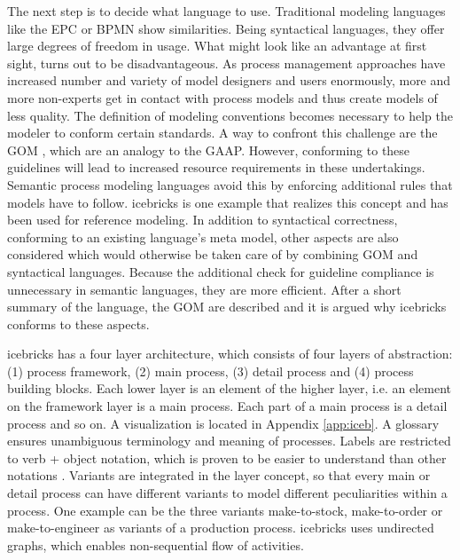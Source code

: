 	 The next step is to decide what language to use. Traditional modeling languages like the \acrfull{EPC} or \acrfull{BPMN} show similarities. Being syntactical languages, they offer large degrees of freedom in usage. What might look like an advantage at first sight, turns out to be disadvantageous. As process management approaches have increased number and variety of model designers and users enormously, more and more non-experts get in contact with process models and thus create models of less quality. The definition of modeling conventions becomes necessary to help the modeler to conform certain standards. A way to confront this challenge are the \acrfull{GOM} \citep{BeckerGOM2012}, which are an analogy to the \acrfull{GAAP}. However, conforming to these guidelines will lead to increased resource requirements in these undertakings. Semantic process modeling languages avoid this by enforcing additional rules that models have to follow. icebricks \citep{clever2016} is one example that realizes this concept and has been used for reference modeling. In addition to syntactical correctness, \ie conforming to an existing language's meta model, other aspects are also considered which would otherwise be taken care of by combining \acrshort{GOM} and syntactical languages. Because the additional check for guideline compliance is unnecessary in semantic languages, they are more efficient. After a short summary of the language,  the \acrshort{GOM} are described and it is argued why icebricks conforms to these aspects. 
	 
	 icebricks has a four layer architecture, which consists of four layers of abstraction: (1) process framework, (2) main process, (3) detail process and (4) process building blocks. Each lower layer is an element of the higher layer, i.e. an element on the framework layer is a main process. Each part of a main process is a detail process and so on. A  visualization is located in Appendix \ref{app:iceb}. A glossary ensures unambiguous terminology and meaning of processes. Labels are restricted to verb + object notation, which is proven to be easier to understand than other notations \citep{Mendling_2010}. Variants are integrated in the layer concept, so that every main or detail process can have different variants to model different peculiarities within a process. One example can be the three variants make-to-stock, make-to-order or make-to-engineer as variants of a production process. icebricks uses undirected graphs, which enables non-sequential flow of activities. 
	 
